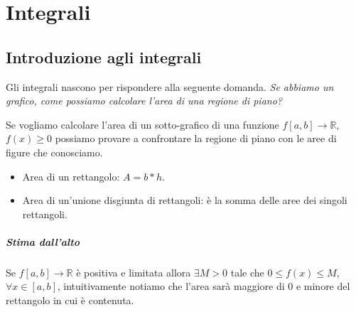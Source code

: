\part{Integrali}

\chapter{Introduzione agli integrali}
Gli integrali nascono per rispondere alla seguente domanda.
\textit{Se abbiamo un grafico, come possiamo calcolare l'area di una regione di piano?}

\begin{center}
\end{center}

Se vogliamo calcolare l'area di un sotto-grafico di una funzione $f[a,b]\to\mathbb{R}$, $f(x)\geq0$ possiamo provare a confrontare la regione di piano con le aree di figure che conosciamo.
\begin{itemize}
    \item Area di un rettangolo: $A=b*h$.
    \item Area di un'unione disgiunta di rettangoli: è la somma delle aree dei singoli rettangoli.
\end{itemize}

\subsubsection{Stima dall'alto}
Se $f[a,b]\to\mathbb{R}$ è positiva e limitata allora $\exists M>0$ tale che $0\leq f(x)\leq M$, $\forall x\in[a,b]$, intuitivamente notiamo che l'area sarà maggiore di 0 e minore del rettangolo in cui è contenuta.

